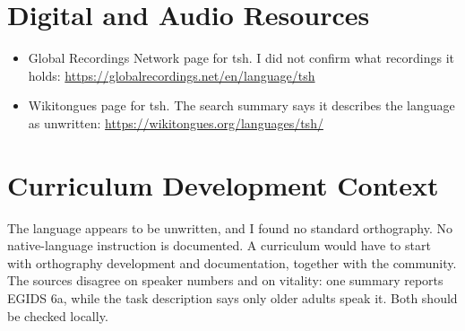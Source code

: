 \documentclass[12pt]{article}
\begin{document}
\section{Digital and Audio Resources}
\begin{itemize}
\item Global Recordings Network page for tsh. I did not confirm what recordings it holds: \url{https://globalrecordings.net/en/language/tsh}
\item Wikitongues page for tsh. The search summary says it describes the language as unwritten: \url{https://wikitongues.org/languages/tsh/}
\end{itemize}

\section{Curriculum Development Context}
The language appears to be unwritten, and I found no standard orthography. No native-language instruction is documented. A curriculum would have to start with orthography development and documentation, together with the community. The sources disagree on speaker numbers and on vitality: one summary reports EGIDS 6a, while the task description says only older adults speak it. Both should be checked locally.
\end{document}
